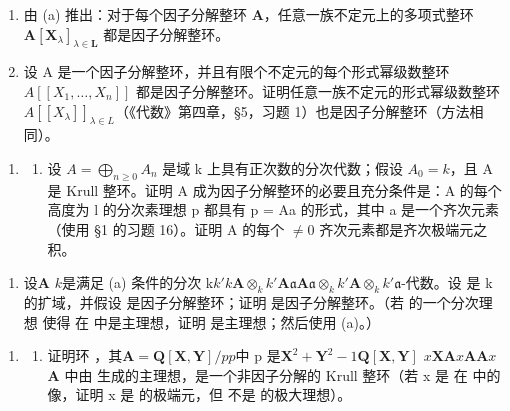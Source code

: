 \begin{enumerate}
\def\labelenumi{(\alph{enumi})}
\setcounter{enumi}{1}
\item
  由 (a) 推出：对于每个因子分解整环 \(\mathbf{A}\)，任意一族不定元上的多项式整环 \(\mathbf{A}[\mathbf{X}_{\lambda}]_{\lambda \in \mathbf{L}}\) 都是因子分解整环。
\item
  设 A 是一个因子分解整环，并且有限个不定元的每个形式幂级数整环 \(A[[X_{1},\ldots,X_{n}]]\) 都是因子分解整环。证明任意一族不定元的形式幂级数整环 \(A[[X_{\lambda}]]_{\lambda\in L}\)（《代数》第四章，§5，习题 1）也是因子分解整环（方法相同）。
\end{enumerate}

\begin{enumerate}
\def\labelenumi{\arabic{enumi}.}
\setcounter{enumi}{2}
\tightlist
\item
  \begin{enumerate}
  \def\labelenumii{(\alph{enumii})}
  \tightlist
  \item
    设 \(A = \bigoplus_{n \geqslant 0} A_n\) 是域 k 上具有正次数的分次代数；假设 \(A_0 = k\)，且 A 是 Krull 整环。证明 A 成为因子分解整环的必要且充分条件是：A 的每个高度为 l 的分次素理想 p 都具有 p = Aa 的形式，其中 a 是一个齐次元素（使用 §1 的习题 16）。证明 A 的每个 \(\neq 0\) 齐次元素都是齐次极端元之积。
  \end{enumerate}
\end{enumerate}

\begin{enumerate}
\def\labelenumi{(\alph{enumi})}
\setcounter{enumi}{1}
\tightlist
\item
  设\(\mathbf{A}\)  \(k\)是满足 (a) 条件的分次 k\(k'\)\(k\)\(\mathbf{A} \otimes_k k'\)\(\mathbf{A}\)\(\mathfrak{a}\)\(\mathbf{A}\)\(\mathfrak{a} \otimes_k k'\)\(\mathbf{A} \otimes_k k'\)\(\mathfrak{a}\)-代数。设  是 k 的扩域，并假设  是因子分解整环；证明  是因子分解整环。（若  的一个分次理想  使得  在  中是主理想，证明  是主理想；然后使用 (a)。）
\end{enumerate}

\begin{enumerate}
\def\labelenumi{\arabic{enumi}.}
\setcounter{enumi}{3}
\tightlist
\item
  \begin{enumerate}
  \def\labelenumii{(\alph{enumii})}
  \tightlist
  \item
    证明环 ，其\(\mathbf{A} = \mathbf{Q}[\mathbf{X},\mathbf{Y}] / p\)\(p\)中 p 是\(\mathbf{X}^2 +\mathbf{Y}^2 -1\)\(\mathbf{Q}[\mathbf{X},\mathbf{Y}]\) \(x\)\(\mathbf{X}\)\(\mathbf{A}\)\(x\)\(\mathbf{A}\)\(\mathbf{A}x\)\(\mathbf{A}\) 中由  生成的主理想，是一个非因子分解的 Krull 整环（若 x 是  在  中的像，证明 x 是  的极端元，但  不是  的极大理想）。
  \end{enumerate}
\end{enumerate}


